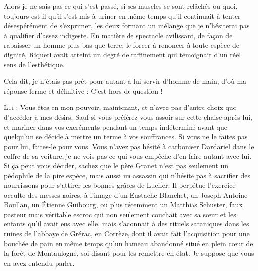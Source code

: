 Alors je ne sais pas ce qui s’est passé, si ses muscles se sont relâchés ou quoi, toujours est-il qu’il s’est mis à uriner en même temps qu’il continuait à tenter désespérément de s’exprimer, les deux formant un mélange que je n’hésiterai pas à qualifier d’assez indigeste. En matière de spectacle avilissant, de façon de rabaisser un homme plus bas que terre, le forcer à renoncer à toute espèce de dignité, Riqueti avait atteint un degré de raffinement qui témoignait d’un réel sens de l’esthétique.

Cela dit, je n’étais pas prêt pour autant à lui servir d’homme de main, d’où ma réponse ferme et définitive : C’est hors de question !

\textsc{Lui} : Vous êtes en mon pouvoir, maintenant, et n’avez pas d’autre choix que d’accéder à mes désirs. Sauf si vous préférez vous assoir sur cette chaise après lui, et mariner dans vos excréments pendant un temps indéterminé avant que quelqu’un se décide à mettre un terme à vos souffrances. Si vous ne le faites pas pour lui, faites-le pour vous. Vous n’avez pas hésité à carboniser Dardariel dans le coffre de sa voiture, je ne vois pas ce qui vous empêche d’en faire autant avec lui. Si ça peut vous décider, sachez que le père Granet n’est pas seulement un pédophile de la pire espèce, mais aussi un assassin qui n’hésite pas à sacrifier des nourrissons pour s’attirer les bonnes grâces de Lucifer. Il perpétue l’exercice occulte des messes noires, à l’image d’un Eustache Blanchet, un Joseph-Antoine Boullan, un Étienne Guibourg, ou plus récemment un Matthias Schuster, faux pasteur mais véritable escroc qui non seulement couchait avec sa sœur et les enfants qu’il avait eus avec elle, mais s’adonnait à des rituels sataniques dans les ruines de l’abbaye de Grérac, en Corrèze, dont il avait fait l’acquisition pour une bouchée de pain en même temps qu’un hameau abandonné situé en plein cœur de la forêt de Montaulogne, soi-disant pour les remettre en état. Je suppose que vous en avez entendu parler.


